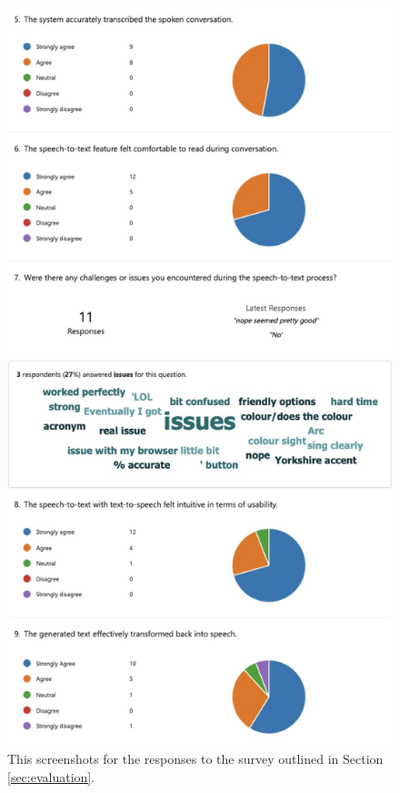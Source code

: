 \documentclass{l4proj}
\begin{document}
\begin{appendices}
\begin{figure}[H]
    \centering
    \includegraphics[width=0.75\linewidth]{dissertation/images/eval-2.jpeg}    
    \caption{This screenshots for the responses to the survey outlined in Section \ref{sec:evaluation}.}
    \label{fig:eval-survey-2} 
\end{figure}


\end{appendices}
\end{document}
